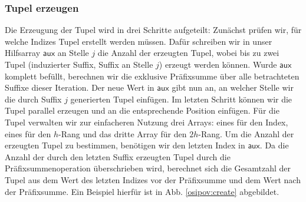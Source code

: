 \subsubsection{Tupel erzeugen}
Die Erzeugung der Tupel wird in drei Schritte aufgeteilt: Zunächst prüfen wir, für welche Indizes Tupel erstellt werden müssen. Dafür schreiben wir in unser Hilfsarray $\mathsf{aux}$ an Stelle $j$ die Anzahl der erzeugten Tupel, wobei bis zu zwei Tupel (induzierter Suffix, Suffix an Stelle $j$) erzeugt werden können. Wurde $\mathsf{aux}$ komplett befüllt, berechnen wir die exklusive Präfixsumme über alle betrachteten Suffixe dieser Iteration. Der neue Wert in $\mathsf{aux}$ gibt nun an, an welcher Stelle wir die durch Suffix $j$ generierten Tupel einfügen. Im letzten Schritt können wir die Tupel parallel erzeugen und an die entsprechende Position einfügen. 
Für die Tupel verwalten wir zur einfacheren Nutzung drei Arrays: eines für den Index, eines für den $h$-Rang und das dritte Array für den $2h$-Rang. Um die Anzahl der erzeugten Tupel zu bestimmen, benötigen wir den letzten Index in $\mathsf{aux}$. Da die Anzahl der durch den letzten Suffix erzeugten Tupel durch die Präfixsummenoperation überschrieben wird, berechnet sich die Gesamtzahl der Tupel aus dem Wert des letzten Indizes vor der Präfixsumme und dem Wert nach der Präfixsumme. Ein Beispiel hierfür ist in Abb. \ref{osipov:create} abgebildet.

